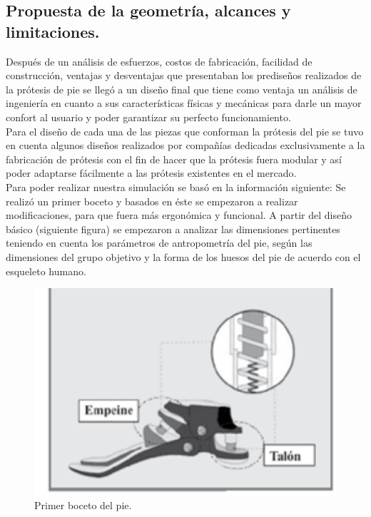 \documentclass{article}
\begin{document}
\subsection{Propuesta de la geometría, alcances y limitaciones.}
Después de un análisis de esfuerzos, costos de fabricación, facilidad de construcción, ventajas y desventajas que presentaban los prediseños realizados de la prótesis de pie se llegó a un diseño final que tiene como ventaja un análisis de ingeniería en cuanto a sus características físicas y mecánicas para darle un mayor confort al usuario y poder garantizar su perfecto funcionamiento.\\
Para el diseño de cada una de las piezas que conforman la prótesis del pie se tuvo en cuenta algunos diseños realizados por compañías dedicadas exclusivamente a la fabricación de prótesis con el fin de hacer que la prótesis fuera modular y así poder adaptarse fácilmente a las prótesis existentes en el mercado.\\
Para poder realizar nuestra simulación se basó en la información siguiente: 
Se realizó un primer boceto y basados en éste se empezaron a realizar modificaciones, para que fuera más ergonómica y funcional. A partir del diseño básico (siguiente figura) se empezaron a analizar las dimensiones pertinentes teniendo en cuenta los parámetros de antropometría del pie, según las dimensiones del grupo objetivo y  la forma de los huesos del  pie  de acuerdo con el esqueleto humano.
\begin{figure}[htp] %
    \centering
    \includegraphics[width=150mm]{boceto 1.png} %
    \caption{Primer boceto del pie.}
    \label{grafica}
\end{figure} 
\newpage
\end{document}
